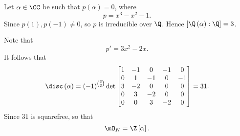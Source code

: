 \documentclass[pmath441]{subfiles}
\begin{document}
    \begin{example}{}
        Let $\alpha\in\CC$ be such that $p\left( \alpha \right) = 0$, where
        \begin{equation*}
            p = x^3-x^2-1.
        \end{equation*}
        Since $p\left( 1 \right),p\left( -1 \right)\neq 0$, so $p$ is irreducible over $\Q$. Hence $\left[ \Q\left( \alpha \right):\Q \right] = 3$. 

        Note that
        \begin{equation*}
            p' = 3x^{2}-2x.
        \end{equation*}
        It follows that
        \begin{equation*}
            \disc\left( \alpha \right) = \left( -1 \right)^{\binom{3}{2}} \det
            \begin{bmatrix}
            	1 & -1 & 0 & -1 & 0 \\
            	0 & 1 & -1 & 0 & -1 \\
            	3 & -2 & 0 & 0 & 0 \\
            	0 & 3 & -2 & 0 & 0 \\
            	0 & 0 & 3 & -2 & 0 \\
            \end{bmatrix} = 31.
        \end{equation*}
        Since $31$ is squarefree, so that
        \begin{equation*}
            \mO_K = \Z\left[ \alpha \right].
        \end{equation*}
    \end{example}
    
    \rruleline
    
    
    
    
    
    
    
    
    
    
    
    
    
    
    
    
    
    
    
    
    
    
    
    
    
    
    
    
    
    
    
    
    
    
    
    
\end{document}

